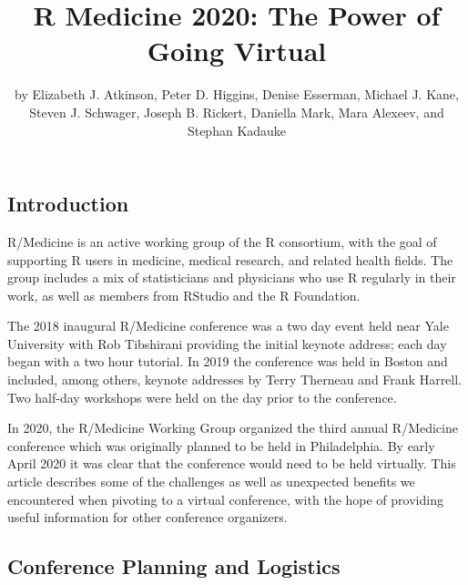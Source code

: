 \title{R Medicine 2020: The Power of Going Virtual}
\author{by Elizabeth J. Atkinson, Peter D. Higgins, Denise
Esserman, Michael J. Kane, Steven J. Schwager, Joseph B.
Rickert, Daniella Mark, Mara Alexeev, and Stephan Kadauke}

\maketitle


\hypertarget{introduction}{%
\subsection{Introduction}\label{introduction}}

R/Medicine is an active working group of the R consortium, with the goal
of supporting R users in medicine, medical research, and related health
fields. The group includes a mix of statisticians and physicians who use
R regularly in their work, as well as members from RStudio and the R
Foundation.

The 2018 inaugural R/Medicine conference was a two day event held near
Yale University with Rob Tibshirani providing the initial keynote
address; each day began with a two hour tutorial. In 2019 the conference
was held in Boston and included, among others, keynote addresses by
Terry Therneau and Frank Harrell. Two half-day workshops were held on
the day prior to the conference.

In 2020, the R/Medicine Working Group organized the third annual
R/Medicine conference which was originally planned to be held in
Philadelphia. By early April 2020 it was clear that the conference would
need to be held virtually. This article describes some of the challenges
as well as unexpected benefits we encountered when pivoting to a virtual
conference, with the hope of providing useful information for other
conference organizers.

\hypertarget{conference-planning-and-logistics}{%
\subsection{Conference Planning and
Logistics}\label{conference-planning-and-logistics}}

